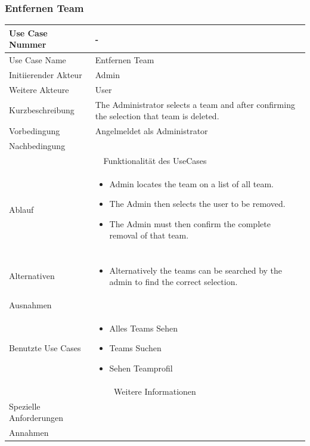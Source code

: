 \documentclass[10pt,a4paper]{article}
\begin{document}
	\subsubsection{Entfernen Team}
	\begin{tabular}{|l|p{.5\linewidth}|}
	\hline Use Case Nummer & - \\ 
	\hline Use Case Name & Entfernen Team \\ 
	\hline Initiierender Akteur & Admin \\
	\hline Weitere Akteure & User \\
	\hline Kurzbeschreibung & The Administrator selects a team and after confirming the selection that team is deleted. \\
	\hline Vorbedingung & Angelmeldet als Administrator \\
	\hline Nachbedingung &  \\
	\hline \multicolumn{2}{|c|}{Funktionalität des UseCases}\\
	\hline Ablauf & \begin{itemize}
			\item Admin locates the team on a list of all team.
			\item The Admin then selects the user to be removed.
			\item The Admin must then confirm the complete removal of that team.
		\end{itemize} \\ \\
	\hline Alternativen & \begin{itemize}
			\item Alternatively the teams can be searched by the admin to find the correct selection.
		\end{itemize} \\
	\hline Ausnahmen &  \\
	\hline Benutzte Use Cases & \begin{itemize}
			\item Alles Teams Sehen
			\item Teams Suchen
			\item Sehen Teamprofil
		\end{itemize} \\
	\hline \multicolumn{2}{|c|}{Weitere Informationen} \\
	\hline Spezielle Anforderungen &  \\
	\hline Annahmen &  \\
	\hline
	\end{tabular}
	
\end{document}
